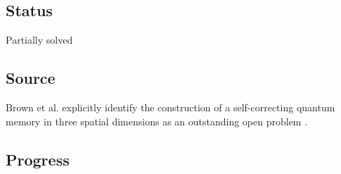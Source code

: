 \subsection*{Status}

Partially solved

\subsection*{Source}

Brown et al. explicitly identify the construction of a self-correcting
quantum memory in three spatial dimensions as an outstanding open problem
.

\subsection*{Progress}

